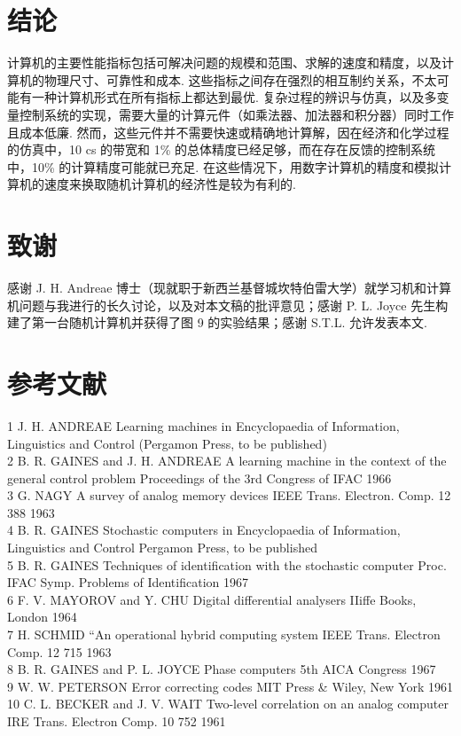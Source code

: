\section{结论}\label{conclusion}

计算机的主要性能指标包括可解决问题的规模和范围、求解的速度和精度，以及计算机的物理尺寸、可靠性和成本. 这些指标之间存在强烈的相互制约关系，不太可能有一种计算机形式在所有指标上都达到最优. 复杂过程的辨识与仿真，以及多变量控制系统的实现，需要大量的计算元件（如乘法器、加法器和积分器）同时工作且成本低廉. 然而，这些元件并不需要快速或精确地计算解，因在经济和化学过程的仿真中，10 cs 的带宽和 1\% 的总体精度已经足够，而在存在反馈的控制系统中，10\% 的计算精度可能就已充足. 在这些情况下，用数字计算机的精度和模拟计算机的速度来换取随机计算机的经济性是较为有利的.

\section{致谢}\label{acknowledgments}

感谢 J. H. Andreae 博士（现就职于新西兰基督城坎特伯雷大学）就学习机和计算机问题与我进行的长久讨论，以及对本文稿的批评意见；感谢 P. L. Joyce 先生构建了第一台随机计算机并获得了图 9 的实验结果；感谢 S.T.L. 允许发表本文.

\section{参考文献}\label{references}

1 J. H. ANDREAE Learning machines in Encyclopaedia of Information,
Linguistics and Control (Pergamon Press, to be published)\\
2 B. R. GAINES and J. H. ANDREAE A learning machine in the context of
the general control problem Proceedings of the 3rd Congress of IFAC
1966\\
3 G. NAGY A survey of analog memory devices IEEE Trans. Electron. Comp.
12 388 1963\\
4 B. R. GAINES Stochastic computers in Encyclopaedia of Information,
Linguistics and Control Pergamon Press, to be published\\
5 B. R. GAINES Techniques of identification with the stochastic computer
Proc. IFAC Symp. Problems of Identification 1967\\
6 F. V. MAYOROV and Y. CHU Digital differential analysers IIiffe Books,
London 1964\\
7 H. SCHMID ``An operational hybrid computing system IEEE Trans.
Electron Comp. 12 715 1963\\
8 B. R. GAINES and P. L. JOYCE Phase computers 5th AICA Congress 1967\\
9 W. W. PETERSON Error correcting codes MIT Press \& Wiley, New York
1961\\
10 C. L. BECKER and J. V. WAIT Two-level correlation on an analog
computer IRE Trans. Electron Comp. 10 752 1961


